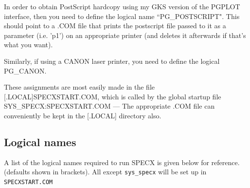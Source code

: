 \documentclass[11pt,twoside]{report}
\begin{document}
In order to obtain PostScript hardcopy using my GKS version of
the PGPLOT interface, then you need to define the logical name
``PG\_POSTSCRIPT".
This should point to a .COM file that prints the postscript file
passed to it as a parameter (i.e. 'p1') on an appropriate printer
(and deletes it afterwards if that's what you want).

Similarly, if using a CANON laser printer, you need to define the
logical PG\_CANON.

These assignments are most easily made in the file 
[.LOCAL]SPECXSTART.COM, which is called by the global
startup file SYS\_SPECX:SPECXSTART.COM  --- The appropriate .COM
file can conveniently be kept in the [.LOCAL] directory also.

\subsection{Logical names}

A list of the logical names required to run SPECX is given below for reference.
(defaults shown in brackets). All except \verb+sys_specx+ will be set up in
\verb+SPECXSTART.COM+ 
\end{document}
